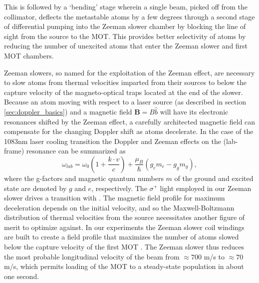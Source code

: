	This is followed by a `bending' stage wherein a single beam, picked off from the collimator, deflects the metastable atoms by a few degrees through a second stage of differential pumping into the Zeeman slower chamber by blocking the line of sight from the source to the MOT.
	This provides better selectivity of \mhe atoms by reducing the number of unexcited atoms that enter the Zeeman slower and first MOT chambers.

	Zeeman slowers, so named for the exploitation of the Zeeman effect, are necessary to slow atoms from thermal velocities imparted from their sources to below the capture velocity of the magneto-optical traps located at the end of the slower.
	Because an atom moving with respect to a laser source (as described in section \ref{sec:doppler_basics}) and a magnetic field $\textbf{B} = B\hat{b}$ will have its electronic resonances shifted by the Zeeman effect, a carefully architected magnetic field can compensate for the changing Doppler shift as atoms decelerate.
	In the case of the 1083nm laser cooling transition the Doppler and Zeeman effects on the (lab-frame) resonance can be summarized as
	\begin{equation}
		\omega_{lab} = \omega_{0}\left(1 + \frac{k\cdot v}{c}\right) + \frac{\mu_B }{\hbar}\left(g_e m_e - g_g m_g\right),
	\end{equation}
	where the g-factors and magnetic quantum numbers $m$ of the ground and excited state are denoted by $g$ and $e$, respectively. 
	The $\sigma^+$ light employed in our Zeeman slower drives a transition with .
	The magnetic field profile for maximum deceleration depends on the initial velocity, and so the Maxwell-Boltzmann distribution of thermal velocities from the source necessitates another figure of merit to optimize against.
	In our experiments the Zeeman slower coil windings are built to create a field profile that maximizes the number of atoms slowed below the capture velocity of the first MOT \cite{Dedman04}.
	The Zeeman slower thus reduces the most probable longitudinal velocity of the beam from $\approx700$ m/s to $\approx70$ m/s, which permits loading of the MOT to a steady-state population in about one second.

